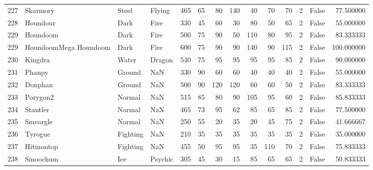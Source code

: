 \begin{tabular}{rlllrrrrrrrrlr}
 227 &                   Skarmory &     Steel &    Flying &    465 &   65 &      80 &      140 &       40 &       70 &     70 &           2 &      False &   77.500000 \\
 228 &                   Houndour &      Dark &      Fire &    330 &   45 &      60 &       30 &       80 &       50 &     65 &           2 &      False &   55.000000 \\
 229 &                   Houndoom &      Dark &      Fire &    500 &   75 &      90 &       50 &      110 &       80 &     95 &           2 &      False &   83.333333 \\
 229 &      HoundoomMega Houndoom &      Dark &      Fire &    600 &   75 &      90 &       90 &      140 &       90 &    115 &           2 &      False &  100.000000 \\
 230 &                    Kingdra &     Water &    Dragon &    540 &   75 &      95 &       95 &       95 &       95 &     85 &           2 &      False &   90.000000 \\
 231 &                     Phanpy &    Ground &       NaN &    330 &   90 &      60 &       60 &       40 &       40 &     40 &           2 &      False &   55.000000 \\
 232 &                    Donphan &    Ground &       NaN &    500 &   90 &     120 &      120 &       60 &       60 &     50 &           2 &      False &   83.333333 \\
 233 &                   Porygon2 &    Normal &       NaN &    515 &   85 &      80 &       90 &      105 &       95 &     60 &           2 &      False &   85.833333 \\
 234 &                   Stantler &    Normal &       NaN &    465 &   73 &      95 &       62 &       85 &       65 &     85 &           2 &      False &   77.500000 \\
 235 &                   Smeargle &    Normal &       NaN &    250 &   55 &      20 &       35 &       20 &       45 &     75 &           2 &      False &   41.666667 \\
 236 &                    Tyrogue &  Fighting &       NaN &    210 &   35 &      35 &       35 &       35 &       35 &     35 &           2 &      False &   35.000000 \\
 237 &                  Hitmontop &  Fighting &       NaN &    455 &   50 &      95 &       95 &       35 &      110 &     70 &           2 &      False &   75.833333 \\
 238 &                   Smoochum &       Ice &   Psychic &    305 &   45 &      30 &       15 &       85 &       65 &     65 &           2 &      False &   50.833333 \\

\end{tabular}
